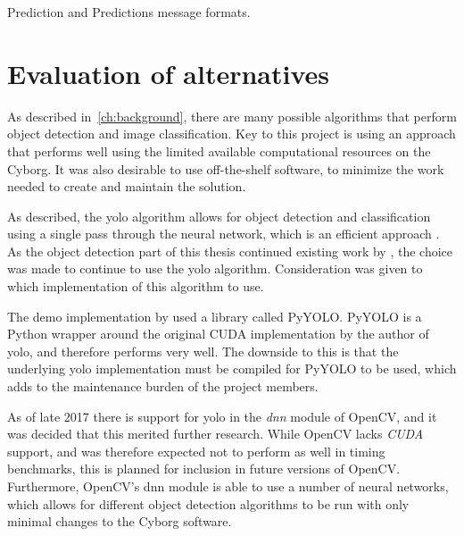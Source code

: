 \documentclass[\rootfolder/main.tex]{subfiles}
\begin{document}
\begin{listing}
    \inputminted{python}{\rootfolder/Chapters/Chapter5/Listings/Prediction.msg}
    \inputminted{python}{\rootfolder/Chapters/Chapter5/Listings/Predictions.msg}
    \caption{Prediction and Predictions message formats.}
    \label{lst:prediction-msg}
\end{listing}


\section{Evaluation of alternatives}

As described in~\cref{ch:background}, there are many possible algorithms that perform object detection and image classification.
Key to this project is using an approach that performs well using the limited available computational resources on the Cyborg.
It was also desirable to use off-the-shelf software, to minimize the work needed to create and maintain the solution.

As described, the \acrshort{yolo} algorithm allows for object detection and classification using a single pass through the neural network, which is an efficient approach \cite{Redmon2015}.
As the object detection part of this thesis continued existing work by \cite{Opheim2018}, the choice was made to continue to use the \acrshort{yolo} algorithm.
Consideration was given to which implementation of this algorithm to use.

The demo implementation by \cite{Opheim2018} used a library called PyYOLO.
PyYOLO is a Python wrapper around the original CUDA implementation by the author of \acrshort{yolo}, and therefore performs very well.
The downside to this is that the underlying \acrshort{yolo} implementation must be compiled for PyYOLO to be used, which adds to the maintenance burden of the project members.

As of late 2017 there is support for \acrshort{yolo} in the \emph{\acrfull{dnn}} module of OpenCV, and it was decided that this merited further research.
While OpenCV lacks \emph{CUDA} support, and was therefore expected not to perform as well in timing benchmarks, this is planned for inclusion in future versions of OpenCV.
Furthermore, OpenCV's \acrshort{dnn} module is able to use a number of neural networks, which allows for different object detection algorithms to be run with only minimal changes to the Cyborg software.
\end{document}

